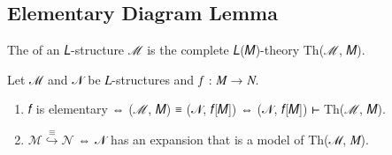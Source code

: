 \documentclass[a4paper,UKenglish,cleveref,autoref,thm-restate,12pt]{lipics-v2021-wjd}
\newcommand{\<}{\langle}
\renewcommand{\>}{\rangle}
\begin{document}
\subsection{Elementary Diagram Lemma}\label{elementary-diagram-lemma}

The  of an 𝐿-structure ℳ is the complete 𝐿(𝑀)-theory Th(ℳ, 𝑀).

\begin{lemma}
 Let ℳ and 𝒩 be 𝐿-structures and 𝑓 : 𝑀 → 𝑁.
\begin{enumerate}
\item  𝑓 is elementary ⇔ (ℳ, 𝑀) ≡ (𝒩, 𝑓[𝑀]) ⇔ (𝒩, 𝑓[𝑀]) ⊢ Th(ℳ, 𝑀).
\item \(ℳ \stackrel{≡}{↪} 𝒩\) ⇔ 𝒩 has an expansion that is a model of Th(ℳ, 𝑀).
\end{enumerate}
\end{lemma}



\end{document}
